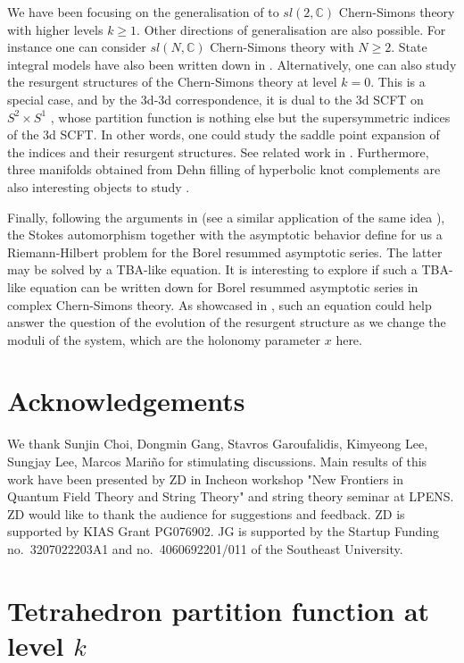 \documentclass[a4paper,11pt]{article}	%
\def\IC{\mathbb{C}}
\begin{document}
We have been focusing on the generalisation of
\cite{Garoufalidis:2020xec,Garoufalidis:2020nut} to $sl(2,\IC)$
Chern-Simons theory with higher levels $k\geq 1$.  Other directions of
generalisation are also possible.  For instance one can consider
$sl(N,\IC)$ Chern-Simons theory with $N\geq 2$.  State integral models
have also been written down in \cite{Dimofte:2013iv}.
%
Alternatively, one can also study the resurgent structures of the
Chern-Simons theory at level $k=0$.  This is a special case, and by
the 3d-3d correspondence, it is dual to the 3d SCFT on $S^2\times S^1$
\cite{Dimofte:2011py}, whose partition function is nothing else but
the supersymmetric indices of the 3d SCFT.  In other words, one could
study the saddle point expansion of the indices and their resurgent
structures. See related work in
\cite{Garoufalids:2022pmi}. Furthermore, three manifolds obtained from
Dehn filling of hyperbolic knot complements are also interesting
objects to study \cite{Gang:2017cwq,Choi:2022dju}.

Finally, following the arguments in \cite{Gaiotto2008cd} (see a
similar application of the same idea \cite{Ito:2018eon}), the Stokes
automorphism together with the asymptotic behavior define for us a
Riemann-Hilbert problem for the Borel resummed asymptotic series.  The
latter may be solved by a TBA-like equation.  It is interesting to
explore if such a TBA-like equation can be written down for Borel
resummed asymptotic series in complex Chern-Simons theory.  As
showcased in \cite{Ito:2018eon}, such an equation could help answer
the question of the evolution of the resurgent structure as we change
the moduli of the system, which are the holonomy parameter $x$ here.

\section*{Acknowledgements}

We thank Sunjin Choi, Dongmin Gang, Stavros Garoufalidis, Kimyeong Lee, Sungjay Lee, Marcos Mari\~no for stimulating
discussions. Main results of this work have been presented by ZD in Incheon workshop "New Frontiers in Quantum Field Theory and String Theory" and string theory seminar at LPENS. ZD would like to thank the audience for suggestions and feedback. ZD is supported by KIAS Grant PG076902. JG is supported by the Startup Funding no.~3207022203A1 and no.~4060692201/011 of the Southeast University.

\appendix

\section{Tetrahedron partition function at level $k$}
\label{sc:dilog}
\end{document}
